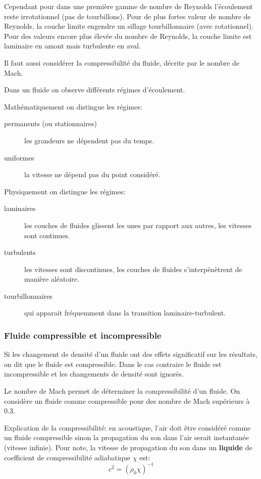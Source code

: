 \documentclass[10pt,a4paper]{article}
\begin{document}
Cependant pour dans une première gamme de nombre de Reynolds l'écoulement reste irrotationnel (pas de tourbillons). Pour de plus fortes valeur de nombre de Reynolds, la couche limite engendre un sillage tourbillonnaire (avec rotationnel). Pour des valeurs encore plus élevée du nombre de Reynolds, la couche limite est laminaire en amont mais turbulente en aval.

Il faut aussi considérer la compressibilité du fluide, décrite par le nombre de Mach\cite{nbmach}.

Dans un fluide on observe différents régimes d'écoulement. 

Mathématiquement on distingue les régimes:
\begin{description}
\item[permanents (ou stationnaires)] les grandeurs ne dépendent pas du temps.
\item[uniformes] la vitesse ne dépend pas du point considéré.
\end{description}

Physiquement on distingue les régimes:
\begin{description}
\item[laminaires] les couches de fluides glissent les unes par rapport aux autres, les vitesses sont continues.
\item[turbulents] les vitesses sont discontinues, les couches de fluides s'interpénètrent de manière aléatoire.
\item[tourbillonnaires] qui apparait fréquemment dans la transition laminaire-turbulent.
\end{description}

\subsubsection{Fluide compressible et incompressible}
Si les changement de densité d'un fluide ont des effets significatif sur les résultats, on dit que le fluide est compressible. Dans le cas contraire le fluide est incompressible et les changements de densité sont ignorés.

Le nombre de Mach\cite{nbmach} permet de déterminer la compressibilité d'un fluide. On considère un fluide comme compressible pour des nombre de Mach supérieurs à $0.3$.

Explication de la compressibilité: en acoustique, l'air doit être considéré comme un fluide compressible sinon la propagation du son dans l'air serait instantanée (vitesse infinie). Pour note, la vitesse de propagation du son\cite{vitesseson} dans un \textbf{liquide} de coefficient de compressibilité adiabatique $\chi$ est:
\begin{equation}
c^{2} = (\rho_{0}\chi)^{-1}
\end{equation}
\end{document}
